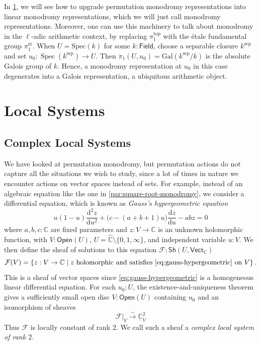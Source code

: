 \documentclass[11pt,letterpaper]{article}
\theoremstyle{numberfirstplain}
\numberwithin{equation}{theorem}
\theoremstyle{numberfirstupright}
\begin{document}
In \cref{sec:local-systems}, we will see how to upgrade permutation monodromy representations into linear monodromy representations, which we will just call monodromy representations.
Moreover, one can use this machinery to talk about monodromy in the $\ell$-adic arithmetic context, by replacing $\pi_1^{\mathrm{top}}$ with the étale fundamental group $\pi_1^{\text{ét}}$. 
When $U=\mathrm{Spec}(k)$ for some $k:\mathsf{Field}$, choose a separable closure $k^{\mathrm{sep}}$ and set $u_0:\operatorname{Spec}(k^{\mathrm{sep}})\to U$. Then $\pi_1(U,u_0)=\mathrm{Gal}(k^{\mathrm{sep}}/k)$ is the absolute Galois group of $k$. Hence, a monodromy representation at $u_0$ in this case degenerates into a Galois representation, a ubiquitous arithmetic object.






\section{Local Systems}\label{sec:local-systems}


\subsection{Complex Local Systems}\label{subsec:complex-local-systems}



We have looked at permutation monodromy, but permutation actions do not capture all the situations we wish to study, since a lot of times in nature we encounter actions on vector spaces instead of sets. 
For example, instead of an algebraic equation like the one in \cref{par:square-root-monodromy}, we consider a differential equation, which is known as \textit{Gauss's hypergeometric equation}
\begin{equation}\label{eq:gauss-hypergeometric}
u(1-u)\frac{\mathrm d^2 z}{\mathrm d u^2}
+\bigl(c-(a+b+1)u\bigr)\frac{\mathrm d z}{\mathrm d u}
-abz=0
\end{equation}
where $a,b,c:\mathbb C$ are fixed parameters and $z:V\rightarrow\mathbb C$ is an unknown holomorphic function, with $V:\mathsf{Open}(U)$, $U=\widehat{\mathbb C}\setminus\{0,1,\infty\}$, and independent variable $u:V$.
We then define the sheaf of solutions to this equation $\mathcal F:\mathsf{Sh}(U,\mathsf{Vect}_{\mathbb C})$
\[
\mathcal F(V)=\left\{z:V\rightarrow\mathbb C\;\middle|\;z\text{ holomorphic and satisfies \eqref{eq:gauss-hypergeometric} on }V\right\}.
\]
This is a sheaf of vector spaces since \eqref{eq:gauss-hypergeometric} is a homogeneous linear differential equation. For each $u_0:U$, the existence-and-uniqueness theorem \cite[Theorem~4.3.1]{HottaTakeuchiTanisaki2008} gives a sufficiently small open disc $V:\mathsf{Open}(U)$ containing $u_0$ and an isomorphism of sheaves
\[
\mathcal F|_V\xrightarrow{\sim}\underline{\mathbb C}_V^2
\]
Thus $\mathcal F$ is locally constant of rank $2$. 
We call such a sheaf a \textit{complex local system of rank $2$}.
\end{document}
